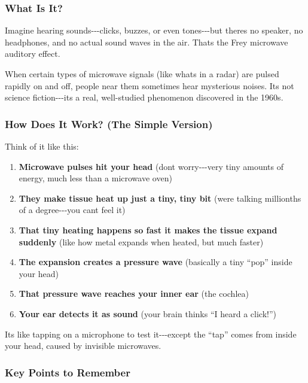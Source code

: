 \subsubsection{What Is It?}\label{what-is-it}

Imagine hearing sounds-\/-\/-clicks, buzzes, or even tones-\/-\/-but
there\textquotesingle s no speaker, no headphones, and no actual sound
waves in the air. That\textquotesingle s the Frey microwave auditory
effect.

When certain types of microwave signals (like what\textquotesingle s in
a radar) are pulsed rapidly on and off, people near them sometimes hear
mysterious noises. It\textquotesingle s not science
fiction-\/-\/-it\textquotesingle s a real, well-studied phenomenon
discovered in the 1960s.

\subsubsection{How Does It Work? (The Simple
Version)}\label{how-does-it-work-the-simple-version}

Think of it like this:

\begin{enumerate}
\def\labelenumi{\arabic{enumi}.}
\tightlist
\item
  \textbf{Microwave pulses hit your head} (don\textquotesingle t
  worry-\/-\/-very tiny amounts of energy, much less than a microwave
  oven)
\item
  \textbf{They make tissue heat up just a tiny, tiny bit}
  (we\textquotesingle re talking millionths of a degree-\/-\/-you
  can\textquotesingle t feel it)
\item
  \textbf{That tiny heating happens so fast it makes the tissue expand
  suddenly} (like how metal expands when heated, but much faster)
\item
  \textbf{The expansion creates a pressure wave} (basically a tiny
  ``pop'' inside your head)
\item
  \textbf{That pressure wave reaches your inner ear} (the cochlea)
\item
  \textbf{Your ear detects it as sound} (your brain thinks ``I heard a
  click!'')
\end{enumerate}

It\textquotesingle s like tapping on a microphone to test
it-\/-\/-except the ``tap'' comes from inside your head, caused by
invisible microwaves.

\subsubsection{Key Points to Remember}\label{key-points-to-remember}

